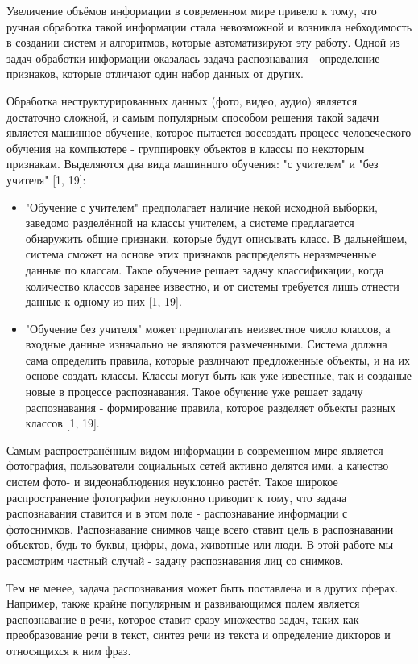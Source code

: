 \documentclass[main.tex]{subfiles}
\begin{document}
Увеличение объёмов информации в современном мире привело к тому, что ручная обработка такой информации стала невозможной и возникла небходимость в создании систем и алгоритмов, которые автоматизируют эту работу. Одной из задач обработки информации оказалась задача распознавания - определение признаков, которые отличают один набор данных от других.

Обработка неструктурированных данных (фото, видео, аудио) является достаточно сложной, и самым популярным способом решения такой задачи является машинное обучение, которое пытается воссоздать процесс человеческого обучения на компьютере - группировку объектов в классы по некоторым признакам. Выделяются два вида машинного обучения: "с учителем" и "без учителя" [1, 19]:
\begin{itemize}
    \item "Обучение с учителем" предполагает наличие некой исходной выборки, заведомо разделённой на классы учителем, а системе предлагается обнаружить общие признаки, которые будут описывать класс. В дальнейшем, система сможет на основе этих признаков распределять неразмеченные данные по классам. Такое обучение решает задачу классификации, когда количество классов заранее известно, и от системы требуется лишь отнести данные к одному из них [1, 19].
    \item "Обучение без учителя" может предполагать неизвестное число классов, а входные данные изначально не являются размеченными. Система должна сама определить правила, которые различают предложенные объекты, и на их основе создать классы. Классы могут быть как уже известные, так и созданые новые в процессе распознавания. Такое обучение уже решает задачу распознавания - формирование правила, которое разделяет объекты разных классов [1, 19].
\end{itemize}

Самым распространённым видом информации в современном мире является фотография, пользователи социальных сетей активно делятся ими, а качество систем фото- и видеонаблюдения неуклонно растёт. Такое широкое распространение фотографии неуклонно приводит к тому, что задача распознавания ставится и в этом поле - распознавание информации с фотоснимков. Распознавание снимков чаще всего ставит цель в распознавании объектов, будь то буквы, цифры, дома, животные или люди. В этой работе мы рассмотрим частный случай - задачу распознавания лиц со снимков.

Тем не менее, задача распознавания может быть поставлена и в других сферах. Например, также крайне популярным и развивающимся полем является распознавание в речи, которое ставит сразу множество задач, таких как преобразование речи в текст, синтез речи из текста и определение дикторов и относящихся к ним фраз.
\end{document}
